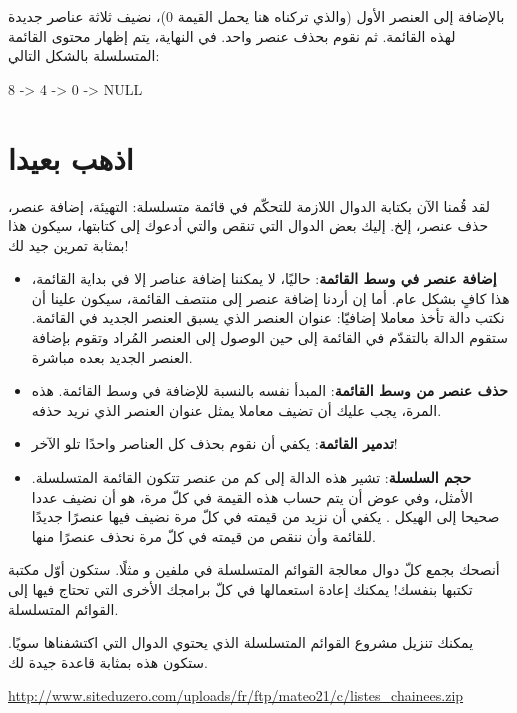 بالإضافة إلى العنصر الأول (والذي تركناه هنا يحمل القيمة 0)، نضيف ثلاثة عناصر جديدة لهذه القائمة. ثم نقوم بحذف عنصر واحد. في النهاية، يتم إظهار محتوى القائمة المتسلسلة بالشكل التالي:

\begin{Console}
8 -> 4 -> 0 -> NULL
\end{Console}


\section{اذهب بعيدا}

 لقد قُمنا الآن بكتابة الدوال اللازمة للتحكّم في قائمة متسلسلة: التهيئة، إضافة عنصر، حذف عنصر، إلخ. إليك بعض الدوال التي تنقص والتي أدعوك إلى كتابتها، سيكون هذا بمثابة تمرين جيد لك!

\begin{itemize}
	\item \textbf{إضافة عنصر في وسط القائمة}:
	حاليًا، لا يمكننا إضافة عناصر إلا في بداية القائمة، هذا كافٍ بشكل عام. أما إن أردنا إضافة عنصر إلى منتصف القائمة، سيكون علينا أن نكتب دالة تأخذ معاملا إضافيّا: عنوان العنصر الذي يسبق العنصر الجديد في القائمة. ستقوم الدالة بالتقدّم في القائمة إلى حين الوصول إلى العنصر المُراد وتقوم بإضافة العنصر الجديد بعده مباشرة.
	\item \textbf{حذف عنصر من وسط القائمة}:
	المبدأ نفسه بالنسبة للإضافة في وسط القائمة. هذه المرة، يجب عليك أن تضيف معاملا يمثل عنوان العنصر الذي نريد حذفه.
	\item \textbf{تدمير القائمة}:
	يكفي أن نقوم بحذف كل العناصر واحدًا تلو الآخر!
	\item \textbf{حجم السلسلة}:
	تشير هذه الدالة إلى كم من عنصر تتكون القائمة المتسلسلة. الأمثل، وفي عوض أن يتم حساب هذه القيمة في كلّ مرة، هو أن نضيف عددا صحيحا
	إلى الهيكل
	.
	يكفي أن نزيد من قيمته في كلّ مرة نضيف فيها عنصرًا جديدًا للقائمة وأن ننقص من قيمته في كلّ مرة نحذف عنصرًا منها.
\end{itemize}

أنصحك بجمع كلّ دوال معالجة القوائم المتسلسلة في ملفين 
و
مثلًا. ستكون أوّل مكتبة تكتبها بنفسك! يمكنك إعادة استعمالها في كلّ برامجك الأخرى التي تحتاج فيها إلى القوائم المتسلسلة.

يمكنك تنزيل مشروع القوائم المتسلسلة الذي يحتوي الدوال التي اكتشفناها سويًا. ستكون هذه بمثابة قاعدة جيدة لك.

\url{http://www.siteduzero.com/uploads/fr/ftp/mateo21/c/listes_chainees.zip}

